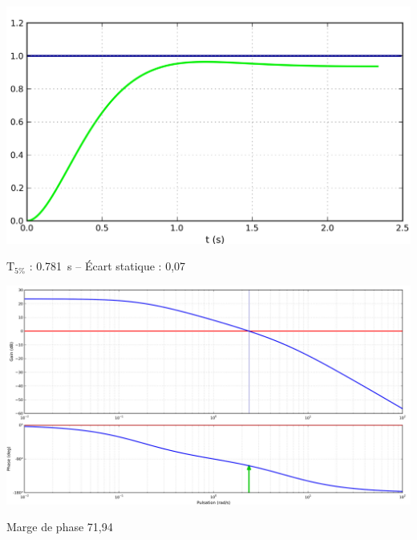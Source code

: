 \documentclass[10pt,fleqn]{article} %
\begin{document}
\noindent
\begin{minipage}[c]{.46\linewidth}
\begin{center}
\includegraphics[width=\linewidth]{images/fig_04a}

$\text{T}_{5\%}$ : \SI{0,781}{s} -- Écart statique : 0,07
\end{center}

\end{minipage} \hfill
\begin{minipage}[c]{.46\linewidth}
\begin{center}
\includegraphics[width=\linewidth]{images/fig_04b}

Marge de phase 71,94 \degres
\end{center}
\end{minipage} 
\end{document}
